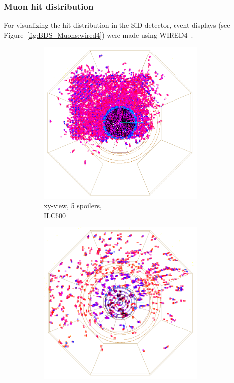 \subsubsection{Muon hit distribution}
For visualizing the hit distribution in the SiD detector, event displays (see Figure~\ref{fig:BDS_Muons:wired4}) were made using WIRED4~\cite{Wired4}.
 \begin{figure}[htbp]
 \centering
  \begin{subfigure}[b]{0.31\textwidth}
   \centering
    \includegraphics[width=0.9\textwidth]{Figures/BDS_muons/muons_positron_5spoilers_2961_xyview_croped_inverted.png}
   \caption{xy-view, 5 spoilers,\\ILC500}
   \end{subfigure}
   \hfill
   \begin{subfigure}[b]{0.31\textwidth}
   \centering
    \includegraphics[width=0.9\textwidth]{Figures/BDS_muons/muons_positron_5spoilers_wall_515_xyview_croped_inverted.png}

\end{subfigure}
\end{figure}
